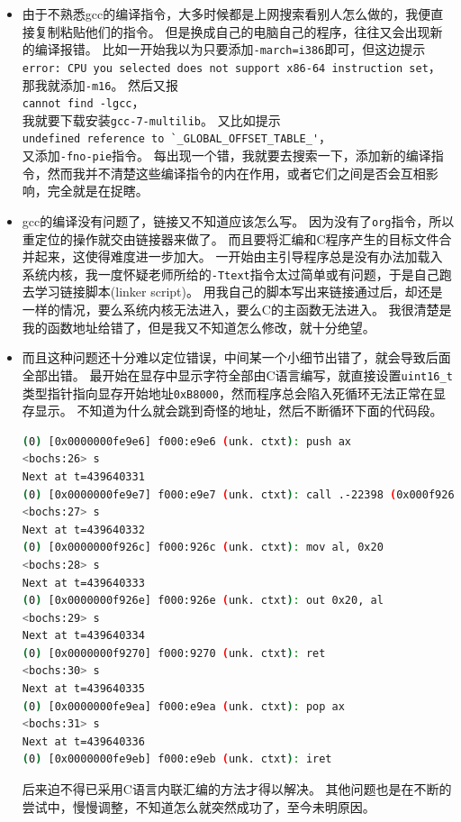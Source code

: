 \documentclass[logo,reportComp]{thesis}
\begin{document}
\begin{itemize}
	\item 由于不熟悉gcc的编译指令，大多时候都是上网搜索看别人怎么做的，我便直接复制粘贴他们的指令。
	但是换成自己的电脑自己的程序，往往又会出现新的编译报错。
	比如一开始我以为只要添加\verb'-march=i386'即可，但这边提示\\\verb'error: CPU you selected does not support x86-64 instruction set'，\\那我就添加\verb'-m16'。
	然后又报\\\verb'cannot find -lgcc'，\\我就要下载安装\verb'gcc-7-multilib'。
	又比如提示\\\verb;undefined reference to `_GLOBAL_OFFSET_TABLE_';，\\又添加\verb'-fno-pie'指令。
	每出现一个错，我就要去搜索一下，添加新的编译指令，然而我并不清楚这些编译指令的内在作用，或者它们之间是否会互相影响，完全就是在捉瞎。
	\item gcc的编译没有问题了，链接又不知道应该怎么写。
	因为没有了\verb'org'指令，所以重定位的操作就交由链接器来做了。
	而且要将汇编和C程序产生的目标文件合并起来，这使得难度进一步加大。
	一开始由主引导程序总是没有办法加载入系统内核，我一度怀疑老师所给的\verb'-Ttext'指令太过简单或有问题，于是自己跑去学习链接脚本(linker script)。
	用我自己的脚本写出来链接通过后，却还是一样的情况，要么系统内核无法进入，要么C的主函数无法进入。
	我很清楚是我的函数地址给错了，但是我又不知道怎么修改，就十分绝望。
	\item 而且这种问题还十分难以定位错误，中间某一个小细节出错了，就会导致后面全部出错。
	最开始在显存中显示字符全部由C语言编写，就直接设置\verb'uint16_t'类型指针指向显存开始地址\verb'0xB8000'，然而程序总会陷入死循环无法正常在显存显示。
	不知道为什么就会跳到奇怪的地址，然后不断循环下面的代码段。
\begin{lstlisting}[language=bash]
(0) [0x0000000fe9e6] f000:e9e6 (unk. ctxt): push ax                   ; 50
<bochs:26> s
Next at t=439640331
(0) [0x0000000fe9e7] f000:e9e7 (unk. ctxt): call .-22398 (0x000f926c) ; e882a8
<bochs:27> s
Next at t=439640332
(0) [0x0000000f926c] f000:926c (unk. ctxt): mov al, 0x20              ; b020
<bochs:28> s
Next at t=439640333
(0) [0x0000000f926e] f000:926e (unk. ctxt): out 0x20, al              ; e620
<bochs:29> s
Next at t=439640334
(0) [0x0000000f9270] f000:9270 (unk. ctxt): ret                       ; c3
<bochs:30> s
Next at t=439640335
(0) [0x0000000fe9ea] f000:e9ea (unk. ctxt): pop ax                    ; 58
<bochs:31> s
Next at t=439640336
(0) [0x0000000fe9eb] f000:e9eb (unk. ctxt): iret                      ; cf
\end{lstlisting}
	后来迫不得已采用C语言内联汇编的方法才得以解决。
	其他问题也是在不断的尝试中，慢慢调整，不知道怎么就突然成功了，至今未明原因。
\end{itemize}
\end{document}
